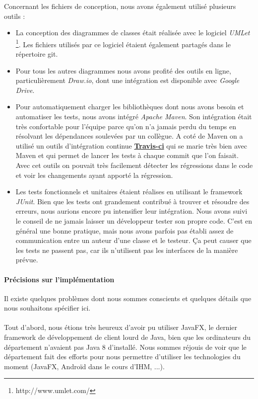 \documentclass[10pt,a4paper]{book}
\begin{document}
Concernant les fichiers de conception, nous avons également utilisé plusieurs outils :
\begin{itemize}
	\item{La conception des diagrammes de classes était réalisée avec le logiciel \textit{UMLet} \footnote{http://www.umlet.com/}. Les fichiers utilisés par ce logiciel étaient également partagés dans le répertoire git.}
	\item{Pour tous les autres diagrammes nous avons profité des outils en ligne, particulièrement \textit{Draw.io}, dont une intégration est disponible avec \textit{Google Drive}.}
	\item{Pour automatiquement charger les bibliothèques dont nous avons besoin et automatiser les tests, nous avons intégré \textit{Apache Maven}. Son intégration était très confortable pour l'équipe parce qu'on n'a jamais perdu du temps en résolvant les dépendances soulevées par un collègue. A coté de Maven on a utilisé un outils d'intégration continue \href{https://travis-ci.org/}{\textbf{Travis-ci}}} qui se marie très bien avec Maven et qui permet de lancer les tests à chaque commit que l'on faisait. Avec cet outils on pouvait très facilement détecter les régressions dans le code et voir les changements ayant apporté la régression.
	\item{Les tests fonctionnels et unitaires étaient réalises en utilisant le framework \textit{JUnit}. Bien que les tests ont grandement contribué à trouver et résoudre des erreurs, nous aurions encore pu intensifier leur intégration. Nous avons suivi le conseil de ne jamais laisser un développeur tester son propre code. C'est en général une bonne pratique, mais nous avons parfois pas établi assez de communication entre un auteur d'une classe et le testeur. Ça peut causer que les tests ne passent pas, car ils n'utilisent pas les interfaces de la manière prévue.}
\end{itemize}

\paragraph{Précisions sur l'implémentation}
Il existe quelques problèmes dont nous sommes conscients et quelques détails que nous souhaitons spécifier ici.
\paragraph{}
Tout d'abord, nous étions très heureux d'avoir pu utiliser JavaFX, le dernier framework de développement de client lourd de Java, bien que les ordinateurs du département n'avaient pas Java 8 d'installé. Nous sommes réjouis de voir que le département fait des efforts pour nous permettre d'utiliser les technologies du moment (JavaFX, Androïd dans le cours d'IHM, ...).
\end{document}
